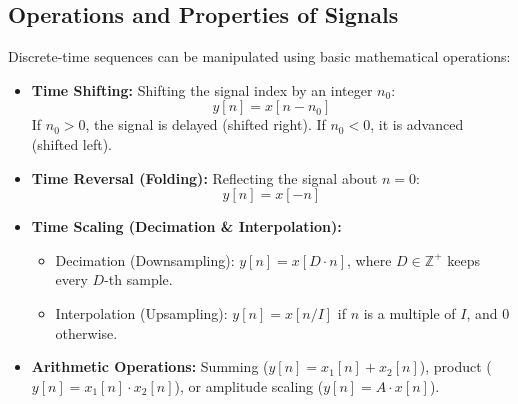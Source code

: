 \documentclass[11pt,a4paper]{article}
\begin{document}
\subsection{Operations and Properties of Signals}
Discrete-time sequences can be manipulated using basic mathematical operations:
\begin{itemize}
    \item \textbf{Time Shifting:} Shifting the signal index by an integer $n_0$:
    \begin{equation}
    y[n] = x[n - n_0]
    \end{equation}
    If $n_0 > 0$, the signal is delayed (shifted right). If $n_0 < 0$, it is advanced (shifted left).
    
    \item \textbf{Time Reversal (Folding):} Reflecting the signal about $n=0$:
    \begin{equation}
    y[n] = x[-n]
    \end{equation}
    
    \item \textbf{Time Scaling (Decimation \& Interpolation):}
    \begin{itemize}
        \item Decimation (Downsampling): $y[n] = x[D \cdot n]$, where $D \in \mathbb{Z}^+$ keeps every $D$-th sample.
        \item Interpolation (Upsampling): $y[n] = x[n/I]$ if $n$ is a multiple of $I$, and $0$ otherwise.
    \end{itemize}
    
    \item \textbf{Arithmetic Operations:} Summing ($y[n] = x_1[n] + x_2[n]$), product ($y[n] = x_1[n] \cdot x_2[n]$), or amplitude scaling ($y[n] = A \cdot x[n]$).
\end{itemize}
\end{document}
